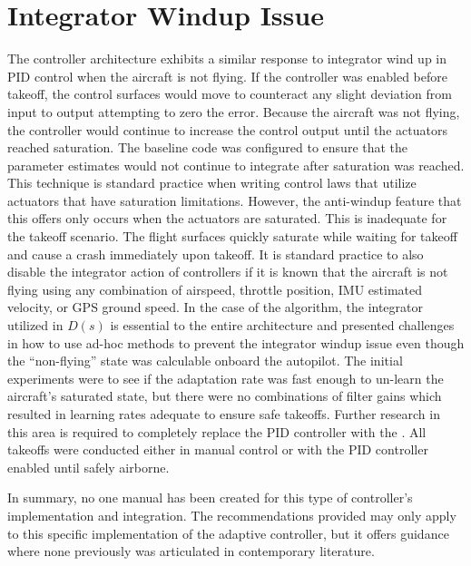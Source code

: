 \section{Integrator Windup Issue}
The \Lone controller architecture exhibits a similar response to integrator wind up in \ac{PID} control when the aircraft is not flying.  If the controller was enabled before takeoff, the control surfaces would move to counteract any slight deviation from input to output attempting to zero the error. Because the aircraft was not flying, the controller would continue to increase the control output until the actuators reached saturation.  The baseline code was configured to ensure that the parameter estimates would not continue to integrate after saturation was reached.  This technique is standard practice when writing control laws that utilize actuators that have saturation limitations.  However, the anti-windup feature that this offers only occurs when the actuators are saturated.  This is inadequate for the takeoff scenario.  The flight surfaces quickly saturate while waiting for takeoff and cause a crash immediately upon takeoff.  It is standard practice to also disable the integrator action of controllers if it is known that the aircraft is not flying using any combination of airspeed, throttle position, \ac{IMU} estimated velocity, or \ac{GPS} ground speed.  In the case of the \Lone algorithm, the integrator utilized in $D(s)$ is essential to the entire architecture and presented challenges in how to use ad-hoc methods to prevent the integrator windup issue even though the \enquote{non-flying} state was calculable onboard the autopilot.  The initial experiments were to see if the adaptation rate was fast enough to un-learn the aircraft's saturated state, but there were no combinations of filter gains which resulted in learning rates adequate to ensure safe takeoffs.  Further research in this area is required to completely replace the \ac{PID} controller with the \Lone.  All takeoffs were conducted either in manual control or with the \ac{PID} controller enabled until safely airborne.

In summary, no one manual has been created for this type of controller's implementation and integration.  The recommendations provided may only apply to this specific implementation of the \Lone adaptive controller, but it offers guidance where none previously was articulated in contemporary literature.
